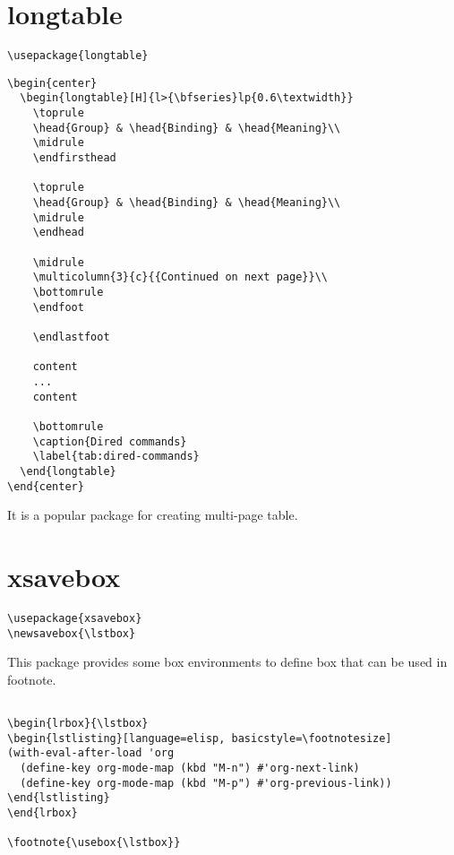 \section{longtable}
\label{sec:longtable}

\begin{lstlisting}
\usepackage{longtable}
\end{lstlisting}

\begin{lstlisting}
\begin{center}
  \begin{longtable}[H]{l>{\bfseries}lp{0.6\textwidth}}
    \toprule
    \head{Group} & \head{Binding} & \head{Meaning}\\
    \midrule
    \endfirsthead

    \toprule
    \head{Group} & \head{Binding} & \head{Meaning}\\
    \midrule
    \endhead

    \midrule
    \multicolumn{3}{c}{{Continued on next page}}\\
    \bottomrule
    \endfoot

    \endlastfoot

    content
    ...
    content
    
    \bottomrule
    \caption{Dired commands}
    \label{tab:dired-commands}
  \end{longtable}
\end{center}
\end{lstlisting}

It is a popular package for creating multi-page table.

\section{xsavebox}
\label{sec:xsavebox}

\begin{lstlisting}
\usepackage{xsavebox}           
\newsavebox{\lstbox}
\end{lstlisting}

This package provides some box environments to define box that can be used in footnote.

\begin{tcolorbox}
\begin{verbatim}

\begin{lrbox}{\lstbox}
\begin{lstlisting}[language=elisp, basicstyle=\footnotesize]
(with-eval-after-load 'org
  (define-key org-mode-map (kbd "M-n") #'org-next-link)
  (define-key org-mode-map (kbd "M-p") #'org-previous-link))
\end{lstlisting}
\end{lrbox}

\footnote{\usebox{\lstbox}}
\end{verbatim}
\end{tcolorbox}




